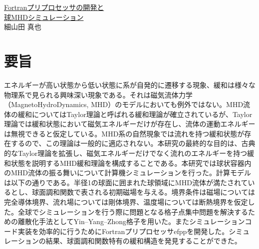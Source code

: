 \documentclass[12pt]{jsarticle}
\begin{document}


\newpage
\thispagestyle{empty}
\begin{center}
\Large{\underline{Fortranプリプロセッサの開発と}}\\
\Large{\underline{球MHDシミュレーション}}\\
\vspace{1.5cm}
\large{細山田 真也}
\end{center}
\vspace{1cm}
\section*{要旨}
エネルギーが高い状態から低い状態に系が自発的に遷移する現象、緩和は様々な物理系で見られる興味深い現象である。それは磁気流体力学（MagnetoHydroDynamics, MHD）のモデルにおいても例外ではない。MHD流体の緩和についてはTaylor理論と呼ばれる緩和理論が確立されているが、Taylor理論では緩和状態において磁気エネルギーだけが存在し、流体の運動エネルギーは無視できると仮定している。MHD系の自然現象では流れを持つ緩和状態が存在するので、この理論は一般的に適応されない。本研究の最終的な目的は、古典的なTaylor理論を拡張し、磁気エネルギーだけでなく流れのエネルギーを持つ緩和状態を説明するMHD緩和理論を構成することである。本研究では球状容器内のMHD流体の振る舞いについて計算機シミュレーションを行った。計算モデルは以下の通りである。半径1の球面に囲まれた球領域にMHD流体が満たされているとし、球面調和関数で表される初期磁場を与える。境界条件は磁場については完全導体境界、流れ場については剛体境界、温度場については断熱境界を仮定した。全球でシミュレーションを行う際に問題となる格子点集中問題を解決するための離散化手法としてYin--Yang--Zhong格子を用いた。またシミュレーションコード実装を効率的に行うためにFortranプリプロセッサefppを開発した。シミュレーションの結果、球面調和関数特有の緩和構造を発見することができた。
\end{document}
